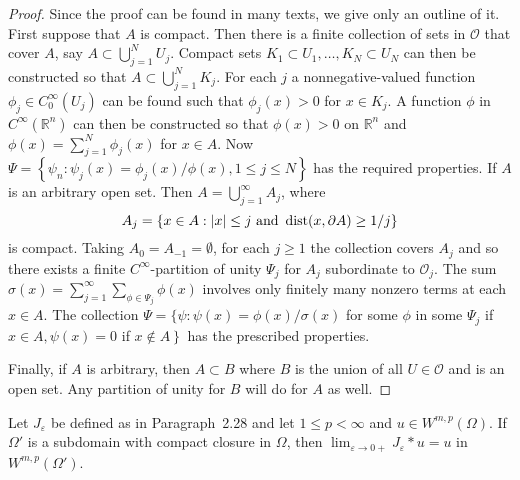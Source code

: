 \begin{proof}
  Since the proof can be found in many texts, we give only an outline of it.
  First suppose that $A$ is compact. Then there is a finite collection of sets in $\mathscr{O}$ 
  that cover $A$, say $A \subset \bigcup_{j=1}^N U_j$.
  Compact sets $K_1 \subset U_1, \ldots, K_N \subset U_N$ can then be constructed so that
  $A \subset \bigcup_{j=1}^N K_j$. For each $j$ a nonnegative-valued function
  $\phi_j \in C_0^{\infty}\left(U_j\right)$ can be found such that $\phi_j(x)>0$
  for $x \in K_j$. A function $\phi$ in $C^{\infty}\left(\mathbb{R}^n\right)$ can then be constructed so that $\phi(x)>0$ on $\mathbb{R}^n$ and $\phi(x)=\sum_{j=1}^N \phi_j(x)$
  for $x \in A$. Now $\Psi=\left\{\psi_n: \psi_j(x)=\phi_j(x) / \phi(x), 1 \leq j \leq N\right\}$ 
  has the required properties.
  If $A$ is an arbitrary open set. Then $A=\bigcup_{j=1}^{\infty} A_j$, where
  \[
  A_j=\{x \in A:|x| \leq j \text { and } \operatorname{dist}(x, \partial A) \geq 1 / j\}
  \]
  is compact. Taking $A_0=A_{-1}=\emptyset$, for each $j \geq 1$ the collection
  covers $A_j$ and so there exists a finite $C^{\infty}$-partition of unity $\Psi_j$ for $A_j$ subordinate to $\mathscr{O}_j$. The sum $\sigma(x)=\sum_{j=1}^{\infty} \sum_{\phi \in \Psi_j} \phi(x)$ involves only finitely many nonzero terms at each $x \in A$. The collection $\Psi=\{\psi: \psi(x)=\phi(x) / \sigma(x)$ for some $\phi$ in some $\Psi_j$ if $x \in A, \psi(x)=0$ if $\left.x \notin A\right\}$ has the prescribed properties.
  
  Finally, if $A$ is arbitrary, then $A \subset B$ where $B$ is the union of all $U \in \mathscr{O}$ and is an open set. Any partition of unity for $B$ will do for $A$ as well.
\end{proof}

\begin{lemma}
  Let $J_\varepsilon$ be defined as in Paragraph~2.28 and let $1 \leq p<\infty$ and $u \in W^{m,p}(\Omega)$. If $\Omega'$ is a subdomain with compact closure in $\Omega$, then $\lim _{\varepsilon \rightarrow 0+} J_\varepsilon * u=u$ in $W^{m,p}\left(\Omega'\right)$.
\end{lemma}

